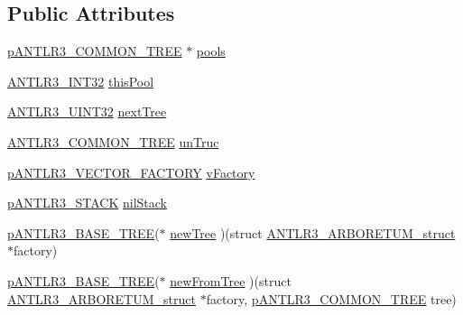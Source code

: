 \subsection*{Public Attributes}
\begin{DoxyCompactItemize}
\item 
\hyperlink{antlr3interfaces_8h_a5671d97032ad9e56b12b661b38b07afd}{p\-A\-N\-T\-L\-R3\-\_\-\-C\-O\-M\-M\-O\-N\-\_\-\-T\-R\-E\-E} $\ast$ \hyperlink{struct_a_n_t_l_r3___a_r_b_o_r_e_t_u_m__struct_af1ca4b92a269636ba1e16b3332e53fe1}{pools}
\item 
\hyperlink{antlr3defs_8h_a6faef5c4687f8eb633d2aefea93973ca}{A\-N\-T\-L\-R3\-\_\-\-I\-N\-T32} \hyperlink{struct_a_n_t_l_r3___a_r_b_o_r_e_t_u_m__struct_a19e4da052a80ecbc584efc6e868fb638}{this\-Pool}
\item 
\hyperlink{antlr3defs_8h_ac41f744abd0fd25144b9eb9d11b1dfd1}{A\-N\-T\-L\-R3\-\_\-\-U\-I\-N\-T32} \hyperlink{struct_a_n_t_l_r3___a_r_b_o_r_e_t_u_m__struct_a3f359543cfbb1db3986c2c1873cd18f7}{next\-Tree}
\item 
\hyperlink{antlr3commontree_8h_a4b5b654f2160825d74a1f69e924ae924}{A\-N\-T\-L\-R3\-\_\-\-C\-O\-M\-M\-O\-N\-\_\-\-T\-R\-E\-E} \hyperlink{struct_a_n_t_l_r3___a_r_b_o_r_e_t_u_m__struct_a1be3818e6d2c0eca5135e6da9cdb63e7}{un\-Truc}
\item 
\hyperlink{antlr3interfaces_8h_ad8cc8ea7436f22eba22791fe0c08804c}{p\-A\-N\-T\-L\-R3\-\_\-\-V\-E\-C\-T\-O\-R\-\_\-\-F\-A\-C\-T\-O\-R\-Y} \hyperlink{struct_a_n_t_l_r3___a_r_b_o_r_e_t_u_m__struct_a0f3ce5ddf38502f608a82ff48c63617c}{v\-Factory}
\item 
\hyperlink{antlr3interfaces_8h_acc1ac4dd91a4d941b628467ac08c0cea}{p\-A\-N\-T\-L\-R3\-\_\-\-S\-T\-A\-C\-K} \hyperlink{struct_a_n_t_l_r3___a_r_b_o_r_e_t_u_m__struct_ab63a7b88bbfa5444b51ac026680643c6}{nil\-Stack}
\item 
\hyperlink{antlr3interfaces_8h_a6313a8a3e8f044398a393bd10c083852}{p\-A\-N\-T\-L\-R3\-\_\-\-B\-A\-S\-E\-\_\-\-T\-R\-E\-E}($\ast$ \hyperlink{struct_a_n_t_l_r3___a_r_b_o_r_e_t_u_m__struct_afcc21b10572980a008d502d22f2e8ee1}{new\-Tree} )(struct \hyperlink{struct_a_n_t_l_r3___a_r_b_o_r_e_t_u_m__struct}{A\-N\-T\-L\-R3\-\_\-\-A\-R\-B\-O\-R\-E\-T\-U\-M\-\_\-struct} $\ast$factory)
\item 
\hyperlink{antlr3interfaces_8h_a6313a8a3e8f044398a393bd10c083852}{p\-A\-N\-T\-L\-R3\-\_\-\-B\-A\-S\-E\-\_\-\-T\-R\-E\-E}($\ast$ \hyperlink{struct_a_n_t_l_r3___a_r_b_o_r_e_t_u_m__struct_a6981716236050e944fea73ab68aa63ee}{new\-From\-Tree} )(struct \hyperlink{struct_a_n_t_l_r3___a_r_b_o_r_e_t_u_m__struct}{A\-N\-T\-L\-R3\-\_\-\-A\-R\-B\-O\-R\-E\-T\-U\-M\-\_\-struct} $\ast$factory, \hyperlink{antlr3interfaces_8h_a5671d97032ad9e56b12b661b38b07afd}{p\-A\-N\-T\-L\-R3\-\_\-\-C\-O\-M\-M\-O\-N\-\_\-\-T\-R\-E\-E} tree)

\end{DoxyCompactItemize}
